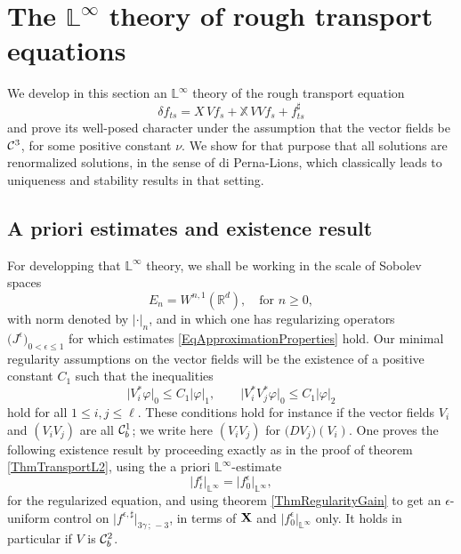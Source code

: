 \documentclass[11pt,a4paper]{amsart}
\newcommand{\RR}{\mathbb{R}}  \newcommand{\CC}{\mathbb{C}}  \newcommand{\LL}{\mathbb{L}}  \newcommand{\WW}{\mathbb{W}}
\newcommand{\bbX}{\mathbb{X}}
\newcommand{\ep}{\epsilon}
\renewcommand{\leq}{\leqslant}
\renewcommand{\geq}{\geqslant}
\numberwithin{equation}{section} %
\begin{document}
\bigskip
 

\section{The $\LL^\infty$ theory of rough transport equations}
\label{SectionLInftyTheory}

We develop in this section an $\LL^\infty$ theory of the rough transport equation 
\begin{equation}
\label{EqTransportEq}
\delta f_{ts} = X\,Vf_s +  \bbX\,V V f_s + f^\sharp_{ts}
\end{equation}  
and prove its well-posed character under the assumption that the vector fields be $\mathcal{C}^3$, for some positive constant $\nu$. We show for that purpose that all solutions are renormalized solutions, in the sense of di Perna-Lions, which classically leads to uniqueness and stability results in that setting. 

\medskip

\subsection{A priori estimates and existence result}
\label{SubsectionAPrioriEstimatesLInfty}

For developping that $\LL^\infty$ theory, we shall be working in the scale of Sobolev spaces 
$$
E_n = W^{n,1}(\RR^d),\quad\textrm{for } n\geq 0,
$$
with norm denoted by $|\cdot|_n$, and in which one has regularizing operators $\big(J^\ep\big)_{0<\epsilon\leq 1}$ for which estimates \eqref{EqApproximationProperties} hold. Our minimal regularity assumptions on the vector fields will be the existence of a positive constant $C_1$ such that the inequalities
\begin{equation}
\label{EqContinuityConditionsVStar}
\big|V_i^*\varphi\big|_0 \leq C_1 |\varphi|_1, \quad\quad \big|V_i^*V_j^*\varphi\big|_0 \leq C_1 |\varphi|_2
\end{equation}
hold for all $1\leq i,j\leq\ell$. These conditions hold for instance if the vector fields $V_i$ and $(V_iV_j)$ are all $\mathcal{C}^1_b$; we write here $(V_iV_j)$ for $\big(DV_j\big)(V_i)$. One proves the following existence result by proceeding exactly as in the proof of theorem \ref{ThmTransportL2}, using the a priori $\LL^\infty$-estimate
$$
\big| f_t^\ep \big|_{\LL^\infty} = \big|f_0^\ep\big|_{\LL^\infty},
$$
for the regularized equation, and using theorem \ref{ThmRegularityGain} to get an $\epsilon$-uniform control on $\big|f^{\epsilon,\sharp}\big|_{3\gamma\,;\,-3}$, in terms of ${\bf X}$ and $\big|f_0^\ep\big|_{\LL^\infty}$ only. It holds in particular if $V$ is $\mathcal{C}^2_b$.
\end{document}
